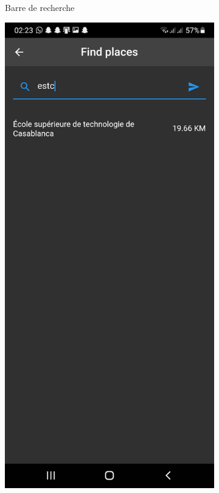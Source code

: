 \begin{figure}[!htbp]
\begin{subfigure}{.3\linewidth}
         \caption{Barre de recherche}
    \end{subfigure} 
    \hfill
    \begin{subfigure}{.3\linewidth}
        \centering
         \includegraphics[width=\textwidth]{assets/app/search/result.jpg}

\end{subfigure}
\end{figure}
